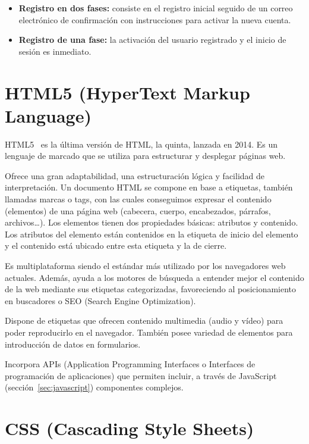 \documentclass[a4paper, 12pt]{book}
\begin{document}
\begin{itemize}
    \item \textbf{Registro en dos fases:} consiste en el registro inicial seguido de un correo electrónico de confirmación con instrucciones para activar la nueva cuenta.
    \item \textbf{Registro de una fase:} la activación del usuario registrado y el inicio de sesión es inmediato.
\end{itemize}


\section{HTML5 (HyperText Markup Language)} 
\label{sec:html5}

HTML5~\cite{html} es la última versión de HTML, la quinta, lanzada en 2014. Es un lenguaje de marcado que se utiliza para estructurar y desplegar páginas web.

\vspace{5mm}
Ofrece una gran adaptabilidad, una estructuración lógica y facilidad de interpretación.
Un documento HTML se compone en base a etiquetas, también llamadas marcas o tags, con las cuales conseguimos expresar el contenido (elementos) de una página web (cabecera, cuerpo, encabezados, párrafos, archivos…).
Los elementos tienen dos propiedades básicas: atributos y contenido.
Los atributos del elemento están contenidos en la etiqueta de inicio del elemento y el contenido está ubicado entre esta etiqueta y la de cierre.

\vspace{5mm}
Es multiplataforma siendo el estándar más utilizado por los navegadores web actuales.
Además, ayuda a los motores de búsqueda a entender mejor el contenido de la web mediante sus etiquetas categorizadas, favoreciendo al posicionamiento en buscadores o SEO (Search Engine Optimization).

\vspace{5mm}
Dispone de etiquetas que ofrecen contenido multimedia (audio y vídeo) para poder reproducirlo en el navegador.
También posee variedad de elementos para introducción de datos en formularios.

\vspace{5mm}
Incorpora APIs (Application Programming Interfaces o Interfaces de programación de aplicaciones) que permiten incluir, a través de JavaScript (sección~\ref{sec:javascript}) componentes complejos.


\section{CSS (Cascading Style Sheets)} 
\label{sec:css}
\end{document}
